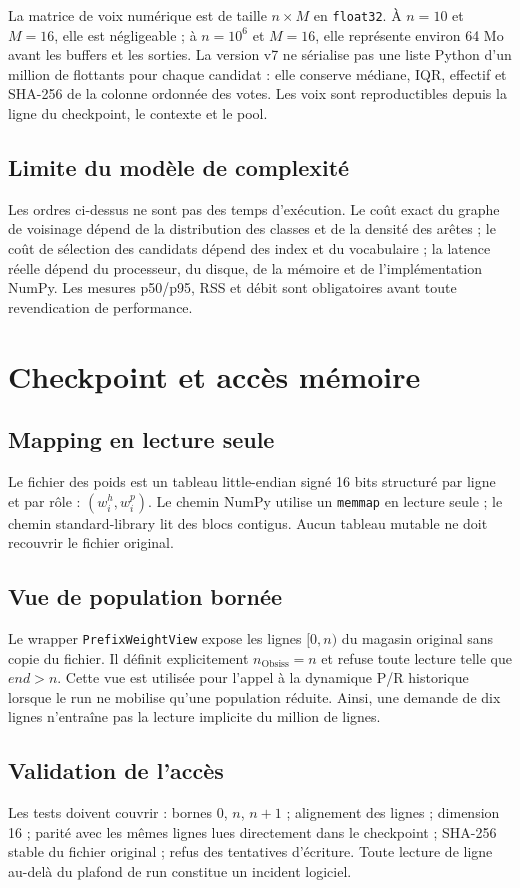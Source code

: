 \documentclass[11pt,a4paper]{report}
\begin{document}
La matrice de voix numérique est de taille $n\times M$ en \texttt{float32}. À $n=10$ et $M=16$, elle est négligeable ; à $n=10^6$ et $M=16$, elle représente environ 64 Mo avant les buffers et les sorties. La version v7 ne sérialise pas une liste Python d'un million de flottants pour chaque candidat : elle conserve médiane, IQR, effectif et SHA-256 de la colonne ordonnée des votes. Les voix sont reproductibles depuis la ligne du checkpoint, le contexte et le pool.

\section{Limite du modèle de complexité}
Les ordres ci-dessus ne sont pas des temps d'exécution. Le coût exact du graphe de voisinage dépend de la distribution des classes et de la densité des arêtes ; le coût de sélection des candidats dépend des index et du vocabulaire ; la latence réelle dépend du processeur, du disque, de la mémoire et de l'implémentation NumPy. Les mesures p50/p95, RSS et débit sont obligatoires avant toute revendication de performance.

\chapter{Checkpoint et accès mémoire}
\section{Mapping en lecture seule}
Le fichier des poids est un tableau little-endian signé 16 bits structuré par ligne et par rôle : $(w_i^h,w_i^p)$. Le chemin NumPy utilise un \texttt{memmap} en lecture seule ; le chemin standard-library lit des blocs contigus. Aucun tableau mutable ne doit recouvrir le fichier original.

\section{Vue de population bornée}
Le wrapper \texttt{PrefixWeightView} expose les lignes $[0,n)$ du magasin original sans copie du fichier. Il définit explicitement $n_{\text{Obsiss}}=n$ et refuse toute lecture telle que $end>n$. Cette vue est utilisée pour l'appel à la dynamique P/R historique lorsque le run ne mobilise qu'une population réduite. Ainsi, une demande de dix lignes n'entraîne pas la lecture implicite du million de lignes.

\section{Validation de l'accès}
Les tests doivent couvrir : bornes $0$, $n$, $n+1$ ; alignement des lignes ; dimension 16 ; parité avec les mêmes lignes lues directement dans le checkpoint ; SHA-256 stable du fichier original ; refus des tentatives d'écriture. Toute lecture de ligne au-delà du plafond de run constitue un incident logiciel.
\end{document}
